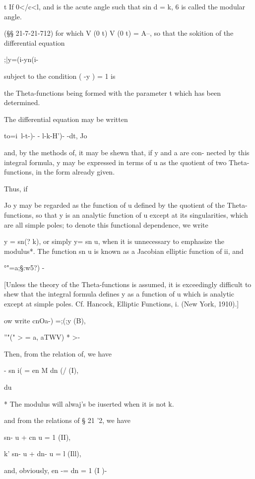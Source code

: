 t If 0</c<l, and is the acute angle such that sin d = k, 6 is called
the modular angle.

%
%

(§§ 21-7-21-712) for which V (0 t) V (0 t) = A--, so that the sokition
of the differential equation

;|y=(i-yn(i-%

subject to the condition ( -y ) = 1 is

the Theta-functions being formed with the parameter t which has been
determined.

The differential equation may be written

to=i\ l-t-)- - l-k-H')- -dt, Jo

and, by the methods of, it may be shewn that, if y and a are
con- nected by this integral formula, y may be expressed in terms of u
as the quotient of two Theta-functions, in the form already given.

Thus, if

Jo y may be regarded as the function of u defined by the quotient of
the Theta- functions, so that y is an analytic function of u except at
its singularities, which are all simple poles; to denote this
functional dependence, we write

y = sn(? k), or simply y= sn u, when it is unnecessary to emphasize
the modulus*. The function sn u is known as a Jacobian elliptic
function of ii, and

 °"=a;§:w5?) -

[Unless the theory of the Theta-functions is assumed, it is
exceedingly difficult to shew that the integral formula defines y as a
function of u which is analytic except at simple poles. Cf. Hancock,
Elliptic Functions, i. (New York, 1910).]

 ow write cnOa-) =;(;y (B),

''"(" > = a, aTWV) * >-

Then, from the relation of, we have

 - sn i( = en M dn (/ (I),

du

* The modulus will alwaj's be iuserted when it is not k.

%
%

and from the relations of § 21 '2, we have

sn- u + cn u = 1 (II),

k' sn- u + dn- u = l (Ill),

and, obviously, en -= dn = 1 (I )-

